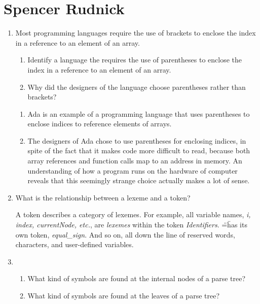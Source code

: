 
\chapter{Spencer Rudnick}

\begin{enumerate}
  \item Most programming languages require the use of brackets to
    enclose the index in a reference to an element of an array.
  \begin{enumerate}
    \item Identify a language the requires the use of parentheses
      to enclose the index in a reference to an element of an array.
    \item Why did the designers of the language choose parentheses
      rather than brackets?
    \end{enumerate}

  \begin{answer}

  \begin{enumerate}
    \item Ada is an example of a programming language that uses parentheses to enclose indices to reference elements of arrays.
    \item The designers of Ada chose to use parentheses for enclosing indices, in spite of the fact that it makes code more difficult to read, because both array references and function calls map to an address in memory. An understanding of how a program runs on the hardware of computer reveals that this seemingly strange choice actually makes a lot of sense.
    \end{enumerate}

    \end{answer}
    
  \item What is the relationship between a lexeme and a token?

  \begin{answer}

    A token describes a category of lexemes. For example, all variable names, \textit{i, index, currentNode, etc.}, are \textit{lexemes} within the token \textit{Identifiers}. \"=\" has its own token, \textit{equal_sign}. And so on, all down the line of reserved words, characters, and user-defined variables.

    \end{answer}

  \item
  \begin{enumerate}
    \item What kind of symbols are found at the internal nodes of a
      parse tree?
    \item What kind of symbols are found at the leaves of a parse tree?
    \end{enumerate}


\end{enumerate}
